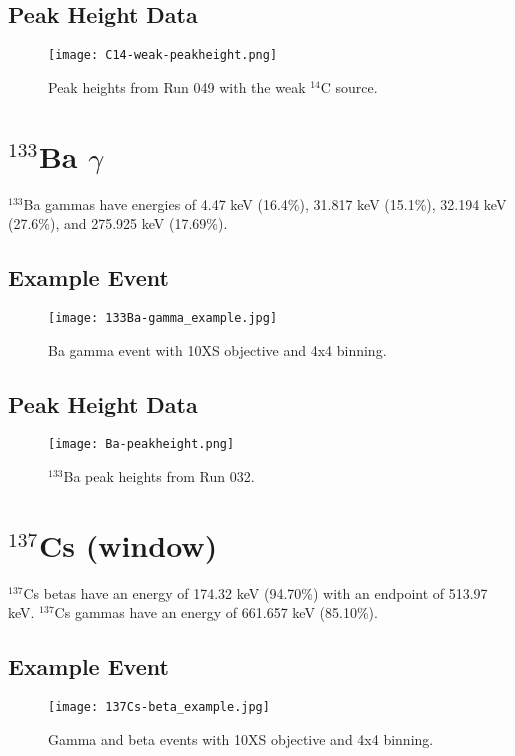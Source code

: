\documentclass[a4paper,10pt]{article}
\begin{document}
\subsection{Peak Height Data}
\begin{figure}[!htbp]
	\centering
	\texttt{[image: C14-weak-peakheight.png]}
	\caption{Peak heights from Run 049 with the weak $^{14}$C source.}
	\label{fig:C-weak-peakheights}
\end{figure}

\section{$^{133}$Ba $\gamma$}

$^{133}$Ba gammas have energies of 4.47 keV (16.4\%), 31.817 keV (15.1\%), 32.194 keV (27.6\%), and 275.925 keV (17.69\%).

\subsection{Example Event}
\begin{figure}[!htbp]
	\centering
	\texttt{[image: 133Ba-gamma\_example.jpg]}
	\caption{Ba gamma event with 10XS objective and 4x4 binning.}
	\label{fig:10XSBagamma}
\end{figure}

\subsection{Peak Height Data}
\begin{figure}[!htbp]
	\centering
	\texttt{[image: Ba-peakheight.png]}
	\caption{$^{133}$Ba peak heights from Run 032.}
	\label{fig:Ba-peakheight}
\end{figure}

\section{$^{137}$Cs (window)}

$^{137}$Cs betas have an energy of 174.32 keV (94.70\%) with an endpoint of 513.97 keV. $^{137}$Cs gammas have an energy of 661.657 keV (85.10\%).

\subsection{Example Event}
\begin{figure}[!htbp]
	\centering
	\texttt{[image: 137Cs-beta\_example.jpg]}
	\caption{Gamma and beta events with 10XS objective and 4x4 binning.}
	\label{fig:10XSCsbeta}
\end{figure} 
\end{document}
